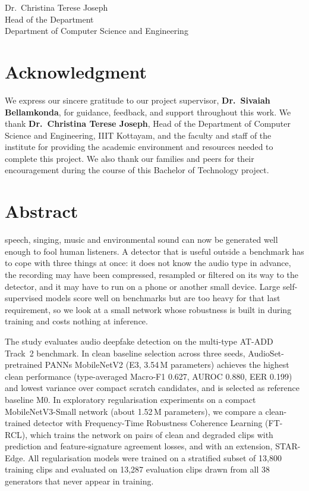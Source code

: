 \documentclass[12pt,a4paper]{report}
\newcommand{\SupervisorName}{Dr.\ Sivaiah Bellamkonda}
\newcommand{\DepartmentName}{Computer Science and Engineering}
\newcommand{\HoDName}{Dr.\ Christina Terese Joseph}
\begin{document}
\vspace{1.8cm}
\noindent\hfill
\begin{minipage}{0.7\textwidth}
\raggedleft
\HoDName\\
Head of the Department\\
Department of \DepartmentName
\end{minipage}

\clearpage
\chapter*{Acknowledgment}
\noindent
We express our sincere gratitude to our project supervisor, \textbf{\SupervisorName}, for guidance, feedback, and support throughout this work. We thank \textbf{\HoDName}, Head of the Department of \DepartmentName, IIIT Kottayam, and the faculty and staff of the institute for providing the academic environment and resources needed to complete this project. We also thank our families and peers for their encouragement during the course of this Bachelor of Technology project.

\clearpage
\chapter*{Abstract}
\begingroup
\setlength{\parskip}{0.4cm}
\noindentSynthetic speech, singing, music and environmental sound can now be generated well enough to fool human listeners. A detector that is useful outside a benchmark has to cope with three things at once: it does not know the audio type in advance, the recording may have been compressed, resampled or filtered on its way to the detector, and it may have to run on a phone or another small device. Large self-supervised models score well on benchmarks but are too heavy for that last requirement, so we look at a small network whose robustness is built in during training and costs nothing at inference.

The study evaluates audio deepfake detection on the multi-type AT-ADD Track~2 benchmark. In clean baseline selection across three seeds, AudioSet-pretrained PANNs MobileNetV2 (E3, 3.54\,M parameters) achieves the highest clean performance (type-averaged Macro-F1 0.627, AUROC 0.880, EER 0.199) and lowest variance over compact scratch candidates, and is selected as reference baseline M0. In exploratory regularisation experiments on a compact MobileNetV3-Small network (about 1.52\,M parameters), we compare a clean-trained detector with Frequency-Time Robustness Coherence Learning (FT-RCL), which trains the network on pairs of clean and degraded clips with prediction and feature-signature agreement losses, and with an extension, STAR-Edge. All regularisation models were trained on a stratified subset of 13{,}800 training clips and evaluated on 13{,}287 evaluation clips drawn from all 38 generators that never appear in training.
\end{document}
